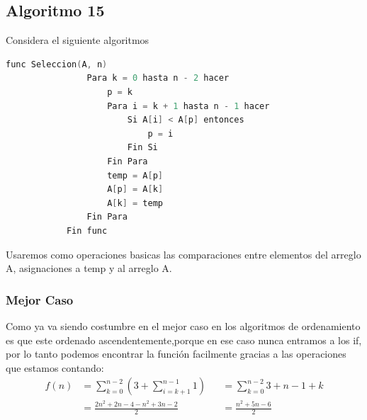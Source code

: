 \documentclass[12pt, fleqn]{article}                            %
\theoremstyle{break}                                            %
\newcommand{\Wrap}[1]    {\left( #1 \right)}                    %
\begin{document}
    \subsection{Algoritmo 15}

        Considera el siguiente algoritmos
        \begin{lstlisting}[language=C, gobble=12, basicstyle=\small\color{white}]
            func Seleccion(A, n)
                Para k = 0 hasta n - 2 hacer            
                    p = k
                    Para i = k + 1 hasta n - 1 hacer    
                        Si A[i] < A[p] entonces         
                            p = i
                        Fin Si                          
                    Fin Para
                    temp = A[p]
                    A[p] = A[k]
                    A[k] = temp                         
                Fin Para
            Fin func
        \end{lstlisting}

        Usaremos como operaciones basicas las comparaciones entre elementos del arreglo A, asignaciones
        a temp y al arreglo A.

        \subsubsection{Mejor Caso}

            Como ya va siendo costumbre en el mejor caso en los algoritmos de ordenamiento es que
            este ordenado ascendentemente,porque en ese caso nunca entramos a los if, por lo tanto 
            podemos encontrar la función facilmente gracias a las operaciones que estamos contando:
            \begin{align*}
                f(n)
                    &= \sum_{k = 0}^{n-2} \Wrap{3 + \sum_{i = k +1}^{n-1} 1}    
                    &&= \sum_{k = 0}^{n-2} 3 + n  - 1 + k                        \\
                    &= \frac{2n^2 + 2n - 4 - n^2+ 3n -2}{2}                     
                    &&= \frac{n^2 + 5n - 6}{2}
            \end{align*}



\end{document}
